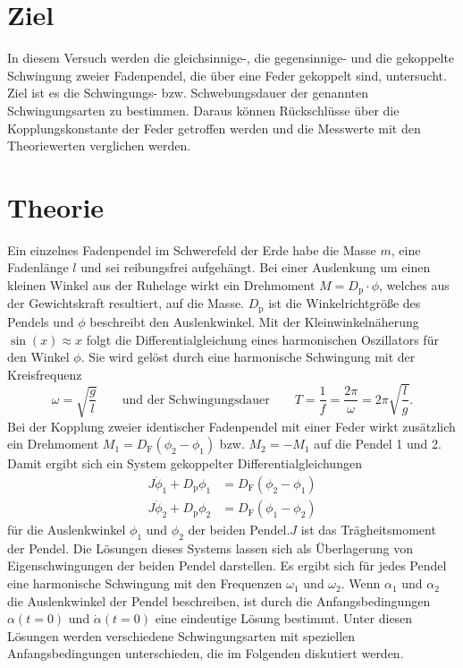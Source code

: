 \section{Ziel}
\label{sec:Ziel}
In diesem Versuch werden die gleichsinnige-, die gegensinnige- und die gekoppelte Schwingung zweier Fadenpendel, die über eine Feder gekoppelt sind, untersucht. 
Ziel ist es die Schwingungs- bzw. Schwebungsdauer der genannten Schwingungsarten zu bestimmen. Daraus können Rückschlüsse über die Kopplungskonstante der Feder getroffen werden
und die Messwerte mit den Theoriewerten verglichen werden.

\section{Theorie}
\label{sec:Theorie}
Ein einzelnes Fadenpendel im Schwerefeld der Erde habe die Masse $m$, eine Fadenlänge $l$ und sei reibungsfrei aufgehängt. Bei einer Auslenkung um einen kleinen Winkel aus der 
Ruhelage wirkt ein Drehmoment $M = D_{\text{p}} \cdot \phi$, welches aus der Gewichtskraft resultiert, auf die Masse. $D_{\text{p}}$ ist die Winkelrichtgröße des Pendels und $\phi$
beschreibt den Auslenkwinkel. Mit der Kleinwinkelnäherung $\sin(x) \approx x$ folgt die Differentialgleichung eines harmonischen Oszillators für den Winkel $\phi$. Sie wird
gelöst durch eine harmonische Schwingung mit der Kreisfrequenz
\begin{equation}
    \label{eqn:omega}
    \omega = \sqrt{\frac{g}{l}} \qquad \text{und der Schwingungsdauer} \qquad T = \frac{1}{f} = \frac{2\pi}{\omega} = 2\pi \sqrt{\frac{l}{g}} .
\end{equation} 
Bei der Kopplung zweier identischer Fadenpendel mit einer Feder wirkt zusätzlich ein Drehmoment $M_1 = D_{\text{F}} (\phi_2 - \phi_1)$ bzw. $M_2 = - M_1$ auf die Pendel 1 und 2. 
Damit ergibt sich ein System gekoppelter Differentialgleichungen
\begin{align*}
    J \ddot\phi_1 + D_{\text{p}} \phi_1 &= D_{\text{F}}(\phi_2 - \phi_1) \\
    J \ddot\phi_2 + D_{\text{p}} \phi_2 &= D_{\text{F}}(\phi_1 - \phi_2)
\end{align*}
für die Auslenkwinkel $\phi_1$ und $\phi_2$ der beiden Pendel.$J$ ist das Trägheitsmoment der Pendel. Die Lösungen dieses Systems lassen sich als Überlagerung von Eigenschwingungen der beiden
Pendel darstellen. Es ergibt sich für jedes Pendel eine harmonische Schwingung mit den Frequenzen $\omega_1$ und $\omega_2$. Wenn $\alpha_1$ und $\alpha_2$ die Auslenkwinkel der
Pendel beschreiben, ist durch die Anfangsbedingungen $\alpha(t = 0)$ und $\dot\alpha(t = 0)$ eine eindeutige Lösung bestimmt. Unter diesen Lösungen werden verschiedene Schwingungsarten
mit speziellen Anfangsbedingungen unterschieden, die im Folgenden diskutiert werden.

